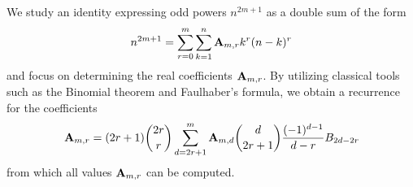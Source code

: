 We study an identity expressing odd powers $n^{2m+1}$ as a double sum of the form
\begin{align*}
    n^{2m+1} = \sum_{r=0}^{m} \sum_{k=1}^{n} {\mathbf{A}} \sb{m,r} k^r (n-k)^r
\end{align*}
and focus on determining the real coefficients ${\mathbf{A}} \sb{m,r}$.
By utilizing classical tools such as the Binomial theorem and Faulhaber’s formula, we obtain
a recurrence for the coefficients
\begin{align*}
    {\mathbf{A}} \sb{m,r}
    = (2r+1) \binom{2r}{r} \sum_{d = 2r+1}^{m} {\mathbf{A}} \sb{m,d} \binom{d}{2r+1} \frac{(-1)^{d-1}}{d-r} {B}\sb{2d-2r}
\end{align*}
from which all values ${\mathbf{A}} \sb{m,r}$ can be computed.
